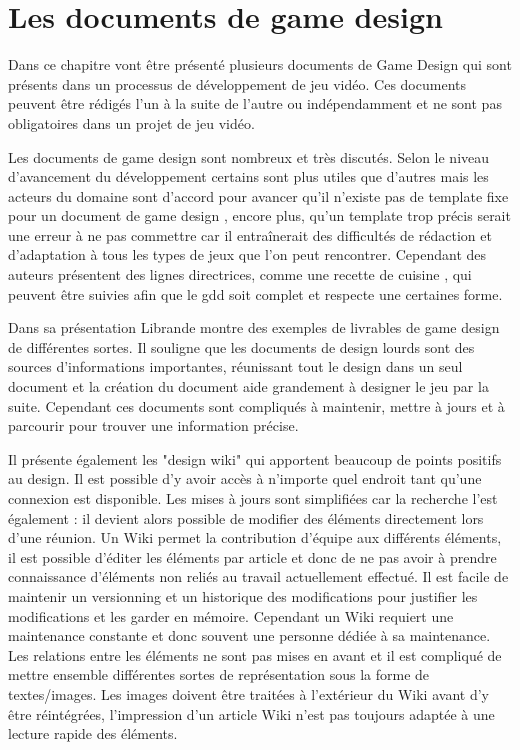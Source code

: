\chapter{Les documents de game design}

Dans ce chapitre vont être présenté plusieurs documents de Game Design qui sont présents dans un processus de développement de jeu vidéo. Ces documents peuvent être rédigés l'un à la suite de l'autre ou indépendamment et ne sont pas obligatoires dans un projet de jeu vidéo.

Les documents de game design sont nombreux et très discutés. Selon le niveau d'avancement du développement certains sont plus utiles que d'autres mais les acteurs du domaine sont d'accord pour avancer qu'il n'existe pas de template fixe pour un document de game design \cite{GD_theory_rouse}, encore plus, qu'un template trop précis serait une erreur à ne pas commettre car il entraînerait des difficultés de rédaction et d'adaptation à tous les types de jeux que l'on peut rencontrer. Cependant des auteurs présentent des lignes directrices, comme une recette de cuisine \cite{LevelUpRogers2014}, qui peuvent être suivies afin que le \gls{gdd} soit complet et respecte une certaines forme. 

Dans sa présentation Librande \cite{onepage_librande} montre des exemples de livrables de game design de différentes sortes. Il souligne que les documents de design lourds sont des sources d'informations importantes, réunissant tout le design dans un seul document et la création du document aide grandement à designer le jeu par la suite. Cependant ces documents sont compliqués à maintenir, mettre à jours et à parcourir pour trouver une information précise.

Il présente également les "design wiki" qui apportent beaucoup de points positifs au design. Il est possible d'y avoir accès à n'importe quel endroit tant qu'une connexion est disponible. Les mises à jours sont simplifiées car la recherche l'est également : il devient alors possible de modifier des éléments directement lors d'une réunion. Un Wiki permet la contribution d'équipe aux différents éléments, il est possible d'éditer les éléments par article et donc de ne pas avoir à prendre connaissance d'éléments non reliés au travail actuellement effectué. Il est facile de maintenir un versionning et un historique des modifications pour justifier les modifications et les garder en mémoire. Cependant un Wiki requiert une maintenance constante et donc souvent une personne dédiée à sa maintenance. Les relations entre les éléments ne sont pas mises en avant et il est compliqué de mettre ensemble différentes sortes de représentation sous la forme de textes/images. Les images doivent être traitées à l'extérieur du Wiki avant d'y être réintégrées, l'impression d'un article Wiki n'est pas toujours adaptée à une lecture rapide des éléments.\\



